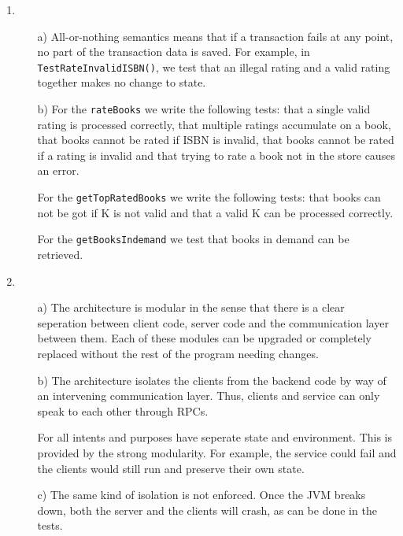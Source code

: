 \documentclass[11pt]{article}
\begin{document}
\begin{enumerate}
  \item
    \begin{itemize}
      \item[a)]
        All-or-nothing semantics means that if a transaction fails at any
        point, no part of the transaction data is saved. For example, in
				\verb|TestRateInvalidISBN()|, we test that an illegal rating and a
				valid rating together makes no change to state.

      \item[b)]
        For the \texttt{rateBooks} we write the following tests: that a
        single valid rating is processed correctly, that multiple ratings
        accumulate on a book, that books cannot be rated if ISBN is
        invalid, that books cannot be rated if a rating is invalid and
        that trying to rate a book not in the store causes an error.

        For the \texttt{getTopRatedBooks} we write the following tests:
        that books can not be got if K is not valid and that a valid K can
        be processed correctly.

        For the \texttt{getBooksIndemand} we test that books in demand can be
        retrieved.
    \end{itemize}
  \item
    \begin{itemize}
      \item[a)]
				The architecture is modular in the sense that there is a clear
        seperation between client code, server code and the communication layer
        between them. Each of these modules can be upgraded or completely
        replaced without the rest of the program needing changes.

      \item[b)]
        The architecture isolates the clients from the backend code by way of
        an intervening communication layer. Thus, clients and service can only
        speak to each other through RPCs.
        
        For all intents and purposes have seperate state and environment. This
        is provided by the strong modularity. For example, the service could
        fail and the clients would still run and preserve their own state.

      \item[c)]
        The same kind of isolation is not enforced. Once the JVM breaks down,
        both the server and the clients will crash, as can be done in the tests.


\end{itemize}
\end{enumerate}
\end{document}
